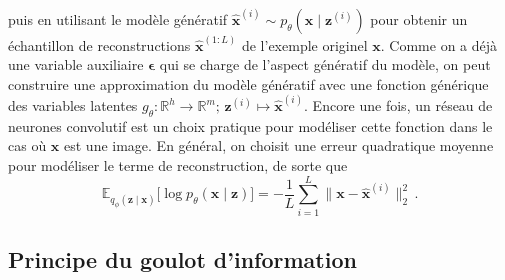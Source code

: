 puis en utilisant le modèle génératif $\hat{\mathbf{x}}^{(i)} \sim p_\theta(\mathbf{x} \mid \mathbf{z}^{(i)})$ pour obtenir 
un échantillon de reconstructions $\mathbf{\hat{x}}^{(1:L)}$ de l'exemple originel $\mathbf{\mathbf{x}}$. 
Comme on a déjà une variable auxiliaire $\boldsymbol{ \epsilon} $ 
qui se charge de l'aspect génératif du modèle, on peut construire une approximation du 
modèle génératif avec une fonction générique des variables latentes 
${g_\theta: \mathbb{R}^{h} \rightarrow \mathbb{R}^{m};\, \mathbf{z}^{(i)} \mapsto \hat{\mathbf{x}}^{(i)}}$.
Encore une fois, un réseau de neurones convolutif est un choix pratique pour modéliser cette fonction 
dans le cas où $\mathbf{x}$ est une image. En général, on choisit une erreur quadratique moyenne pour modéliser le terme de reconstruction, 
de sorte que
\begin{equation}\label{eq:reconstruction}
        \mathbb{E}_{q_\phi(\mathbf{z} \mid \mathbf{x})} \bigg[
                \log p_\theta(\mathbf{x} \mid \mathbf{z})
        \bigg] 
        = -\frac{1}{L}\sum_{i=1}^{L} \lVert \mathbf{x} - \hat{\mathbf{x}}^{(i)} \rVert_2^{2}\, .
\end{equation} 

\subsection{Principe du goulot d'information}

